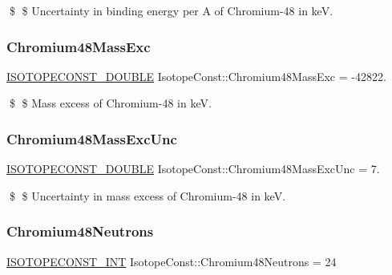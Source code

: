 \$ \$ Uncertainty in binding energy per A of Chromium-\/48 in keV. \mbox{\label{group___isotope_const-_chromium-_cr48_gac75ea9d71f1759f1c62c2e2ea633ecb2}} 
\subsubsection{\texorpdfstring{Chromium48\+Mass\+Exc}{Chromium48MassExc}}
{\footnotesize\ttfamily \mbox{\hyperlink{group___isotope_const-_macros_ga8f45a7272ce02c0b4c65c44636ed719a}{I\+S\+O\+T\+O\+P\+E\+C\+O\+N\+S\+T\+\_\+\+D\+O\+U\+B\+LE}} Isotope\+Const\+::\+Chromium48\+Mass\+Exc = -\/42822.}

\$ \$ Mass excess of Chromium-\/48 in keV. \mbox{\label{group___isotope_const-_chromium-_cr48_ga1bdfe06f70e75d6182abbf8cdcec44ba}} 
\subsubsection{\texorpdfstring{Chromium48\+Mass\+Exc\+Unc}{Chromium48MassExcUnc}}
{\footnotesize\ttfamily \mbox{\hyperlink{group___isotope_const-_macros_ga8f45a7272ce02c0b4c65c44636ed719a}{I\+S\+O\+T\+O\+P\+E\+C\+O\+N\+S\+T\+\_\+\+D\+O\+U\+B\+LE}} Isotope\+Const\+::\+Chromium48\+Mass\+Exc\+Unc = 7.}

\$ \$ Uncertainty in mass excess of Chromium-\/48 in keV. \mbox{\label{group___isotope_const-_chromium-_cr48_gaf6c5e08bd65e12f977b7190924f707b0}} 
\subsubsection{\texorpdfstring{Chromium48\+Neutrons}{Chromium48Neutrons}}
{\footnotesize\ttfamily \mbox{\hyperlink{group___isotope_const-_macros_ga5f18360b3e99483a35c32d789e62621c}{I\+S\+O\+T\+O\+P\+E\+C\+O\+N\+S\+T\+\_\+\+I\+NT}} Isotope\+Const\+::\+Chromium48\+Neutrons = 24}


